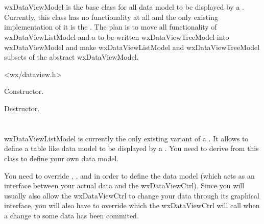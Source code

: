 
\section{}\label{wxdataviewmodel}

wxDataViewModel is the base class for all data model to be
displayed by a . 
Currently, this class has no functionality at all and the
only existing implementation of it is the 
. The
plan is to move all functionality of wxDataViewListModel
and a to-be-written wxDataViewTreeModel into wxDataViewModel
and make wxDataViewListModel and wxDataViewTreeModel subsets
of the abstract wxDataViewModel.




<wx/dataview.h>



\label{wxdataviewmodelwxdataviewmodel}


Constructor.

\label{wxdataviewmodeldtor}


Destructor.

\section{}\label{wxdataviewlistmodel}

wxDataViewListModel is currently the only existing variant
of a . It allows
to define a table like data model to be displayed by a
. You need to derive
from this class to define your own data model.

You need to override ,
,
 and
 in order to
define the data model (which acts as an interface between 
your actual data and the wxDataViewCtrl). Since you will
usually also allow the wxDataViewCtrl to change your data
through its graphical interface, you will also have to override
 which the
wxDataViewCtrl will call when a change to some data has been
commited.

